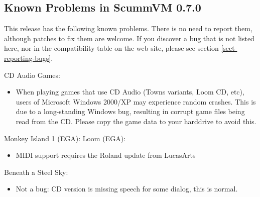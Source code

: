 

\subsection{Known Problems in ScummVM 0.7.0}

This release has the following known problems. There is no need to report them,
although patches to fix them are welcome. If you discover a bug that is not
listed here, nor in the compatibility table on the web site, please see
section \ref{sect-reporting-bugs}.

CD Audio Games:
  \begin{itemize}
  \item When playing games that use CD Audio (Towns variants, Loom CD, etc),
            users of Microsoft Windows 2000/XP may experience random crashes.
            This is due to a long-standing Windows bug, resulting in corrupt
            game files being read from the CD. Please copy the game data to
            your harddrive to avoid this.
  \end{itemize}

Monkey Island 1 (EGA):
Loom (EGA):
  \begin{itemize}
  \item MIDI support requires the Roland update from LucasArts
  \end{itemize}

Beneath a Steel Sky:
  \begin{itemize}
  \item Not a bug: CD version is missing speech for some dialog, this is
            normal.
  \end{itemize}
